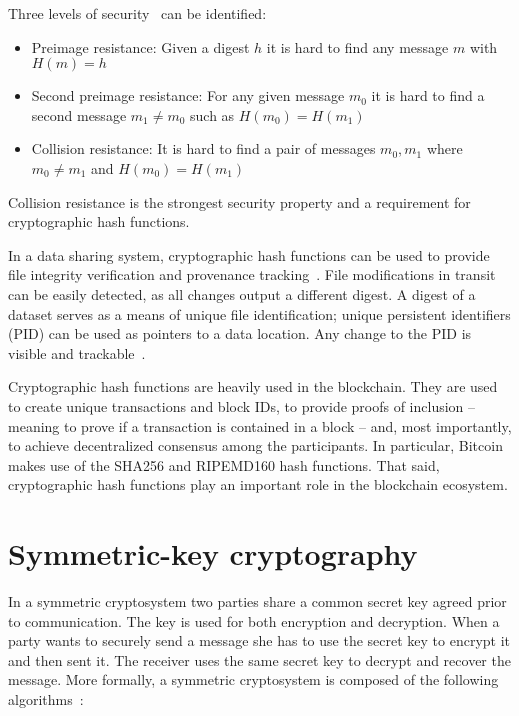 Three levels of security~\cite{Katz:2014:IMC:2700550} can be identified:

\begin{itemize}
  \item Preimage resistance: Given a digest $h$ it is hard to find any message $m$ with $H(m) = h$
  \item Second preimage resistance: For any given message $m_0$ it is hard to find a second message $m_1 \neq m_0$ such as $H(m_0) = H(m_1)$
  \item Collision resistance: It is hard to find a pair of messages $m_0, m_1$ where $m_0 \neq m_1$ and $H(m_0) = H(m_1)$
\end{itemize}

Collision resistance is the strongest security property and a requirement for cryptographic hash functions.

In a data sharing system, cryptographic hash functions can be used to provide file integrity verification and provenance tracking~\cite{10.1109/SPW.2015.27, Azaria2016}. File modifications in transit can be easily detected, as all changes output a different digest. A digest of a dataset serves as a means of unique file identification; unique persistent identifiers (PID) can be used as pointers to a data location. Any change to the PID is visible and trackable~\cite{dist_pid}.

Cryptographic hash functions are heavily used in the blockchain. They are used to create unique transactions and block IDs, to provide proofs of inclusion -- meaning to prove if a transaction is contained in a block -- and, most importantly, to achieve decentralized consensus among the participants. In particular, Bitcoin makes use of the SHA256 and RIPEMD160 hash functions. That said, cryptographic hash functions play an important role in the blockchain ecosystem.

\section{Symmetric-key cryptography}
\label{preliminaries:sym}

In a symmetric cryptosystem two parties share a common secret key agreed prior to communication. The key is used for both encryption and decryption. When a party wants to securely send a message she has to use the secret key to encrypt it and then sent it. The receiver uses the same secret key to decrypt and recover the message. More formally, a symmetric cryptosystem is composed of the following algorithms~\cite{Katz:2014:IMC:2700550, kiagias:crypto}:

